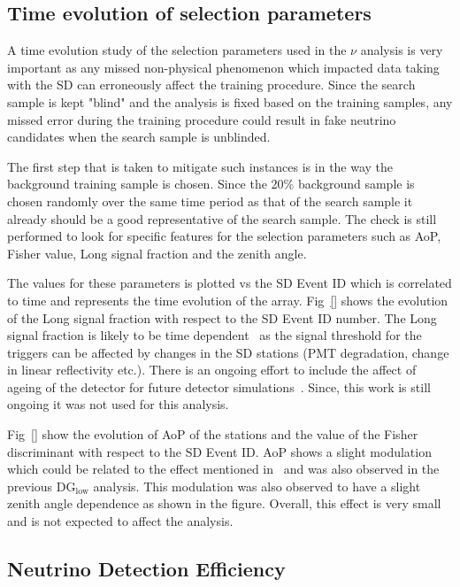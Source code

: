 \subsection{Time evolution of selection parameters}
\label{subsec:nu_sel_timeev}

A time evolution study of the selection parameters used in the $\nu$ analysis is very important as any missed non-physical phenomenon which impacted data taking with the SD can erroneously affect the training procedure. Since the search sample is kept "blind" and the analysis is fixed based on the training samples, any missed error during the training procedure could result in fake neutrino candidates when the search sample is unblinded. 

The first step that is taken to mitigate such instances is in the way the background training sample is chosen. Since the 20\% background sample is chosen randomly over the same time period as that of the search sample it already should be a good representative of the search sample. The check is still performed to look for specific features for the selection parameters such as AoP, Fisher value, Long signal fraction and the zenith angle. 

The values for these parameters is plotted vs the SD Event ID which is correlated to time and represents the time evolution of the array. Fig~\ref{} shows the evolution of the Long signal fraction with respect to the SD Event ID number. The Long signal fraction is likely to be time dependent~\cite{Sato:2011zze} as the signal threshold for the triggers can be affected by changes in the SD stations (PMT degradation, change in linear reflectivity etc.). There is an ongoing effort to include the affect of ageing of the detector for future detector simulations~\cite{PierreAuger:2023xfj}. Since, this work is still ongoing it was not used for this analysis. 

Fig~\ref{} show the evolution of AoP of the stations and the value of the Fisher discriminant with respect to the SD Event ID. AoP shows a slight modulation which could be related to the effect mentioned in~\cite{Sato:2011zze} and was also observed in the previous DG$\mathrm{_{low}}$ analysis. This modulation was also observed to have a slight zenith angle dependence as shown in the figure. Overall, this effect is very small and is not expected to affect the analysis.

\subsection{Neutrino Detection Efficiency}
\label{subsec:nu_sel_nudeteff}


